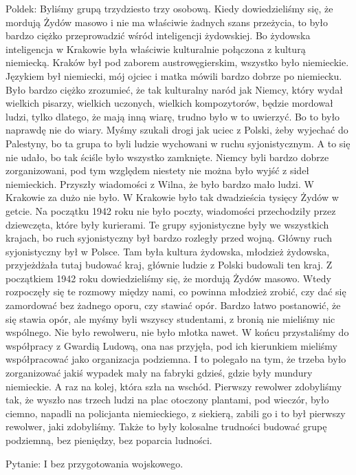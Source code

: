 Poldek: Byliśmy grupą trzydziesto trzy osobową. Kiedy dowiedzieliśmy się, że mordują Żydów masowo i nie ma właściwie żadnych szans przeżycia, to było bardzo ciężko przeprowadzić wśród inteligencji żydowskiej. Bo żydowska inteligencja w Krakowie była właściwie kulturalnie połączona z kulturą niemiecką. Kraków był pod zaborem austrowęgierskim, wszystko było niemieckie. Językiem był niemiecki, mój ojciec i matka mówili bardzo dobrze po niemiecku. Było bardzo ciężko zrozumieć, że tak kulturalny naród jak Niemcy, który wydał wielkich pisarzy, wielkich uczonych, wielkich kompozytorów, będzie mordował ludzi, tylko dlatego, że mają inną wiarę, trudno było w to uwierzyć. Bo to było naprawdę nie do wiary. Myśmy szukali drogi jak uciec z Polski, żeby wyjechać do Palestyny, bo ta grupa to byli ludzie wychowani w ruchu syjonistycznym. A to się nie udało, bo tak ściśle było wszystko zamknięte. Niemcy byli bardzo dobrze zorganizowani, pod tym względem niestety nie można było wyjść z sideł niemieckich. Przyszły wiadomości z Wilna, że było bardzo mało ludzi. W Krakowie za dużo nie było. W Krakowie było tak dwadzieścia tysięcy Żydów w getcie. Na początku 1942 roku nie było poczty, wiadomości przechodziły przez dziewczęta, które były kurierami. Te grupy syjonistyczne były we wszystkich krajach, bo ruch syjonistyczny był bardzo rozległy przed wojną. Główny ruch syjonistyczny był w Polsce. Tam była kultura żydowska, młodzież żydowska, przyjeżdżała tutaj budować kraj, głównie ludzie z Polski budowali ten kraj. Z początkiem 1942 roku dowiedzieliśmy się, że mordują Żydów masowo. Wtedy rozpoczęły się te rozmowy między nami, co powinna młodzież zrobić, czy dać się zamordować bez żadnego oporu, czy stawiać opór. Bardzo łatwo postanowić, że się stawia opór, ale myśmy byli wszyscy studentami, z bronią nie mieliśmy nic wspólnego. Nie było rewolweru, nie było młotka nawet. W końcu przystaliśmy do współpracy z Gwardią Ludową, ona nas przyjęła, pod ich kierunkiem mieliśmy współpracować jako organizacja podziemna. I to polegało na tym, że trzeba było zorganizować jakiś wypadek mały na fabryki gdzieś, gdzie były mundury niemieckie. A raz na kolej, która szła na wschód. Pierwszy rewolwer zdobyliśmy tak, że wyszło nas trzech ludzi na plac otoczony plantami, pod wieczór, było ciemno, napadli na policjanta niemieckiego, z siekierą, zabili go i to był pierwszy rewolwer, jaki zdobyliśmy. Także to były kolosalne trudności budować grupę podziemną, bez pieniędzy, bez poparcia ludności. 

Pytanie: I bez przygotowania wojskowego. 

